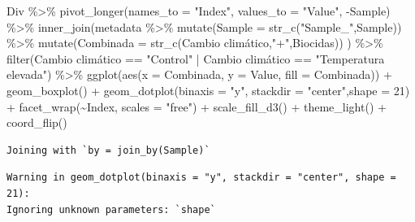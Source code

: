 \documentclass[
  letterpaper,
  DIV=11,
  numbers=noendperiod]{scrartcl}
\newenvironment{Shaded}{\begin{snugshade}}{\end{snugshade}}
\newcommand{\AttributeTok}[1]{\textcolor[rgb]{0.40,0.45,0.13}{#1}}
\newcommand{\DecValTok}[1]{\textcolor[rgb]{0.68,0.00,0.00}{#1}}
\newcommand{\FunctionTok}[1]{\textcolor[rgb]{0.28,0.35,0.67}{#1}}
\newcommand{\NormalTok}[1]{\textcolor[rgb]{0.00,0.23,0.31}{#1}}
\newcommand{\SpecialCharTok}[1]{\textcolor[rgb]{0.37,0.37,0.37}{#1}}
\newcommand{\StringTok}[1]{\textcolor[rgb]{0.13,0.47,0.30}{#1}}
\begin{document}
\begin{Shaded}
\begin{Highlighting}[]
\NormalTok{Div }\SpecialCharTok{\%\textgreater{}\%} 
  \FunctionTok{pivot\_longer}\NormalTok{(}\AttributeTok{names\_to =} \StringTok{"Index"}\NormalTok{, }\AttributeTok{values\_to =} \StringTok{"Value"}\NormalTok{, }\SpecialCharTok{{-}}\NormalTok{Sample) }\SpecialCharTok{\%\textgreater{}\%} 
  \FunctionTok{inner\_join}\NormalTok{(metadata }\SpecialCharTok{\%\textgreater{}\%} 
               \FunctionTok{mutate}\NormalTok{(}\AttributeTok{Sample =} \FunctionTok{str\_c}\NormalTok{(}\StringTok{"Sample\_"}\NormalTok{,Sample)) }\SpecialCharTok{\%\textgreater{}\%} 
               \FunctionTok{mutate}\NormalTok{(}\AttributeTok{Combinada =} \FunctionTok{str\_c}\NormalTok{(}\StringTok{\textasciigrave{}}\AttributeTok{Cambio climático}\StringTok{\textasciigrave{}}\NormalTok{,}\StringTok{"+"}\NormalTok{,Biocidas))}
\NormalTok{             ) }\SpecialCharTok{\%\textgreater{}\%} 
  \FunctionTok{filter}\NormalTok{(}\StringTok{\textasciigrave{}}\AttributeTok{Cambio climático}\StringTok{\textasciigrave{}} \SpecialCharTok{==} \StringTok{"Control"} \SpecialCharTok{|} \StringTok{\textasciigrave{}}\AttributeTok{Cambio climático}\StringTok{\textasciigrave{}} \SpecialCharTok{==} \StringTok{"Temperatura elevada"}\NormalTok{) }\SpecialCharTok{\%\textgreater{}\%} 
  \FunctionTok{ggplot}\NormalTok{(}\FunctionTok{aes}\NormalTok{(}\AttributeTok{x =}\NormalTok{ Combinada, }\AttributeTok{y =}\NormalTok{ Value, }\AttributeTok{fill =}\NormalTok{ Combinada)) }\SpecialCharTok{+} 
  \FunctionTok{geom\_boxplot}\NormalTok{() }\SpecialCharTok{+} 
  \FunctionTok{geom\_dotplot}\NormalTok{(}\AttributeTok{binaxis =} \StringTok{"y"}\NormalTok{, }\AttributeTok{stackdir =} \StringTok{"center"}\NormalTok{,}\AttributeTok{shape =} \DecValTok{21}\NormalTok{) }\SpecialCharTok{+}
  \FunctionTok{facet\_wrap}\NormalTok{(}\SpecialCharTok{\textasciitilde{}}\NormalTok{Index, }\AttributeTok{scales =} \StringTok{"free"}\NormalTok{) }\SpecialCharTok{+}
  \FunctionTok{scale\_fill\_d3}\NormalTok{() }\SpecialCharTok{+} 
  \FunctionTok{theme\_light}\NormalTok{() }\SpecialCharTok{+} \FunctionTok{coord\_flip}\NormalTok{()}
\end{Highlighting}
\end{Shaded}

\begin{verbatim}
Joining with `by = join_by(Sample)`
\end{verbatim}

\begin{verbatim}
Warning in geom_dotplot(binaxis = "y", stackdir = "center", shape = 21):
Ignoring unknown parameters: `shape`
\end{verbatim}
\end{document}

